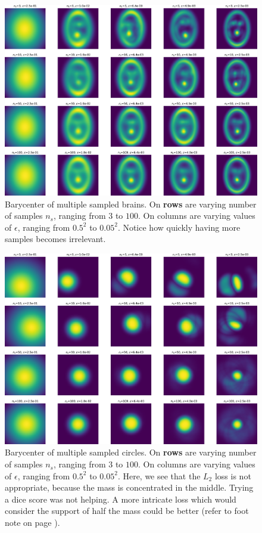 \begin{figure}[p]
    \centering
    \includegraphics[width=.9\textwidth]{samples/2/all_brains.png}
    \caption{Barycenter of multiple sampled brains. On \textbf{rows} are varying number of samples $n_s$, ranging from $3$ to $100$. On columns are varying values of $\epsilon$, ranging from $0.5^2$ to $0.05^2$. Notice how quickly having more samples becomes irrelevant.}
    \label{fig:all_brains}
\end{figure}

\begin{figure}[p]
    \centering
    \includegraphics[width=.9\textwidth]{samples/2/all_circles.png}
    \caption{Barycenter of multiple sampled circles. On \textbf{rows} are varying number of samples $n_s$, ranging from $3$ to $100$. On columns are varying values of $\epsilon$, ranging from $0.5^2$ to $0.05^2$. Here, we see that the $L_2$ loss is not appropriate, because the mass is concentrated in the middle. Trying a dice score was not helping. A more intricate loss which would consider the support of half the mass could be better (refer to foot note on page \pageref{my_error}).}
    \label{fig:all_circles}
\end{figure}

